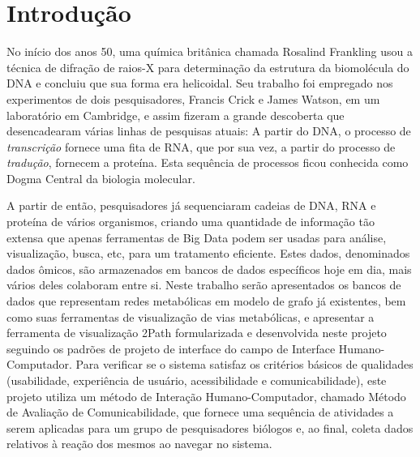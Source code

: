 \chapter*{Introdução}


\indent No início dos anos 50, uma química britânica chamada Rosalind Frankling usou a técnica de difração de raios-X para determinação da estrutura da biomolécula do DNA e concluiu que sua forma era helicoidal. Seu trabalho foi empregado nos experimentos de dois pesquisadores, Francis Crick e James Watson, em um laboratório em Cambridge, e assim fizeram a grande descoberta que desencadearam várias linhas de pesquisas atuais: A partir do DNA, o processo de \textit{transcrição} fornece uma fita de RNA, que por sua vez, a partir do processo de \textit{tradução}, fornecem a proteína. Esta sequência de processos ficou conhecida como Dogma Central da biologia molecular.


\indent A partir de então, pesquisadores já sequenciaram cadeias de DNA, RNA e proteína de vários organismos, criando uma quantidade de informação tão extensa que apenas ferramentas de Big Data podem ser usadas para análise, visualização, busca, etc, para um tratamento eficiente. Estes dados, denominados dados ômicos, são armazenados em bancos de dados específicos hoje em dia, mais vários deles colaboram entre si. Neste trabalho serão apresentados os bancos de dados que representam redes metabólicas em modelo de grafo já existentes, bem como suas ferramentas de visualização de vias metabólicas, e apresentar a ferramenta de visualização 2Path formularizada e desenvolvida neste projeto seguindo os padrões de projeto de interface do campo de Interface Humano-Computador. Para verificar se o sistema satisfaz os critérios básicos de qualidades (usabilidade, experiência de usuário, acessibilidade e comunicabilidade), este projeto utiliza um método de Interação Humano-Computador, chamado Método de Avaliação de Comunicabilidade, que fornece uma sequência de atividades a serem aplicadas para um grupo de pesquisadores biólogos e, ao final, coleta dados relativos à reação dos mesmos ao navegar no sistema.




